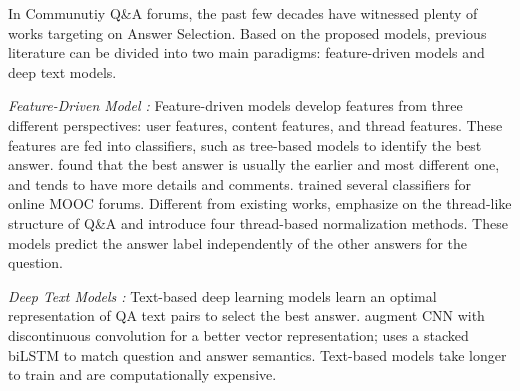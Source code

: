 In Communutiy Q\&A forums, the past few decades have witnessed plenty of works targeting on Answer Selection. Based on the proposed models, previous literature can be divided into two main paradigms: feature-driven models and deep text models.

\noindent
\emph{Feature-Driven Model \cite{BurelMA16,  JendersKN16, TianZL13, TianL16}:}
Feature-driven models \cite{BurelMA16} develop features from three different perspectives: user features, content features, and thread features.
These features are fed into classifiers, such as tree-based models \cite{BurelMA16, JendersKN16, TianZL13} to identify the best answer. \citet{TianZL13} found that the best answer is usually the earlier and most different one, and tends to have more details and comments. \citet{JendersKN16} trained several classifiers for online MOOC forums. Different from existing works, \citet{BurelMA16} emphasize on the thread-like structure of Q\&A and introduce four thread-based normalization methods. These models predict the answer label independently of the other answers for the question.

\noindent
\emph{Deep Text Models \cite{ZhangLSW17, WuWS18, WangN15, SukhbaatarSWF15}:} Text-based deep learning models learn an optimal representation of QA text pairs to select the best answer. \citet{FengXGWZ15} augment CNN with discontinuous convolution for a better vector representation; \citet{WangN15} uses a stacked biLSTM to match question and answer semantics.
Text-based models take longer to train and are computationally expensive.
